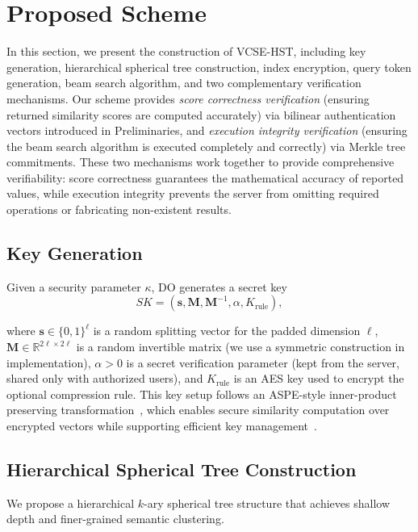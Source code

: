 \documentclass[journal]{IEEEtran}
\begin{document}
\section{Proposed Scheme}
\label{sec:scheme}

In this section, we present the construction of VCSE-HST, including key generation, hierarchical spherical tree construction, index encryption, query token generation, beam search algorithm, and two complementary verification mechanisms. Our scheme provides \emph{score correctness verification} (ensuring returned similarity scores are computed accurately) via bilinear authentication vectors introduced in Preliminaries, and \emph{execution integrity verification} (ensuring the beam search algorithm is executed completely and correctly) via Merkle tree commitments. These two mechanisms work together to provide comprehensive verifiability: score correctness guarantees the mathematical accuracy of reported values, while execution integrity prevents the server from omitting required operations or fabricating non-existent results.

\subsection{Key Generation}

Given a security parameter $\kappa$, DO generates a secret key
\[
 SK=(\mathbf{s}, \mathbf{M}, \mathbf{M}^{-1}, \alpha, K_{\text{rule}}),
\]

where $\mathbf{s}\in\{0,1\}^{\ell}$ is a random splitting vector for the padded dimension $\ell$, $\mathbf{M}\in\mathbb{R}^{2\ell\times 2\ell}$ is a random invertible matrix (we use a symmetric construction in implementation), $\alpha>0$ is a secret verification parameter (kept from the server, shared only with authorized users), and $K_{\text{rule}}$ is an AES key used to encrypt the optional compression rule. This key setup follows an ASPE-style inner-product preserving transformation~\cite{wong2009secure}, which enables secure similarity computation over encrypted vectors while supporting efficient key management~\cite{liu2016efficient}.

\subsection{Hierarchical Spherical Tree Construction}

We propose a hierarchical $k$-ary spherical tree structure that achieves shallow depth and finer-grained semantic clustering.
\end{document}

